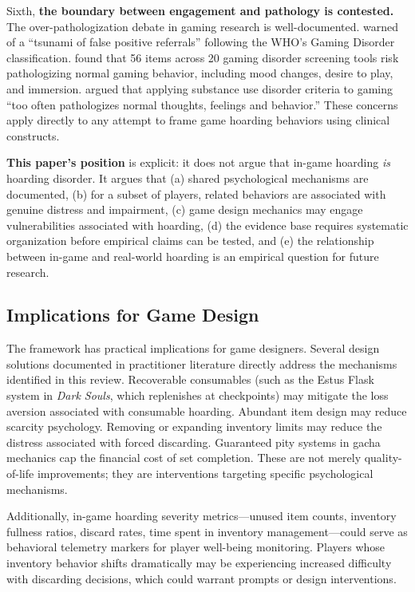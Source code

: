 \documentclass[12pt]{article}
\begin{document}
Sixth, \textbf{the boundary between engagement and pathology is contested.} The over-pathologization debate in gaming research is well-documented. \citet{Aarseth2017} warned of a ``tsunami of false positive referrals'' following the WHO's Gaming Disorder classification. \citet{King2020} found that 56 items across 20 gaming disorder screening tools risk pathologizing normal gaming behavior, including mood changes, desire to play, and immersion. \citet{Bean2017} argued that applying substance use disorder criteria to gaming ``too often pathologizes normal thoughts, feelings and behavior.'' These concerns apply directly to any attempt to frame game hoarding behaviors using clinical constructs.

\textbf{This paper's position} is explicit: it does not argue that in-game hoarding \textit{is} hoarding disorder. It argues that (a) shared psychological mechanisms are documented, (b) for a subset of players, related behaviors are associated with genuine distress and impairment, (c) game design mechanics may engage vulnerabilities associated with hoarding, (d) the evidence base requires systematic organization before empirical claims can be tested, and (e) the relationship between in-game and real-world hoarding is an empirical question for future research.

\subsection{Implications for Game Design}

The framework has practical implications for game designers. Several design solutions documented in practitioner literature directly address the mechanisms identified in this review. Recoverable consumables (such as the Estus Flask system in \textit{Dark Souls}, which replenishes at checkpoints) may mitigate the loss aversion associated with consumable hoarding. Abundant item design may reduce scarcity psychology. Removing or expanding inventory limits may reduce the distress associated with forced discarding. Guaranteed pity systems in gacha mechanics cap the financial cost of set completion. These are not merely quality-of-life improvements; they are interventions targeting specific psychological mechanisms.

Additionally, in-game hoarding severity metrics---unused item counts, inventory fullness ratios, discard rates, time spent in inventory management---could serve as behavioral telemetry markers for player well-being monitoring. Players whose inventory behavior shifts dramatically may be experiencing increased difficulty with discarding decisions, which could warrant prompts or design interventions.
\end{document}
